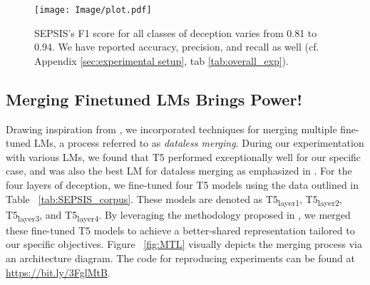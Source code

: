 \vspace{-1.5mm}
\begin{figure}[H]
\centering
\vspace{-2mm}
\texttt{[image: Image/plot.pdf]}
\vspace{-7mm}
\caption{SEPSIS's F1 score for all classes of deception varies from 0.81 to 0.94. We have reported accuracy, precision, and recall as well (cf. Appendix \ref{sec:experimental setup}, tab \ref{tab:overall_exp}).}
\label{fig:MTL_result}
\vspace{-4mm}
\end{figure}
\vspace{-2mm}

\noindent
\vspace{-5mm}
\subsection{Merging Finetuned LMs Brings Power!}
\vspace{-1mm}
Drawing inspiration from \cite{jin2022dataless}, we incorporated techniques for merging multiple fine-tuned LMs, a process referred to as \emph{dataless merging}. During our experimentation with various LMs, we found that T5 performed exceptionally well for our specific case, and was also the best LM for dataless merging as emphasized in \cite{jin2022dataless}. For the four layers of deception, we fine-tuned four T5 models using the data outlined in Table ~\ref{tab:SEPSIS_corpus}. These models are denoted as T5\textsubscript{layer1}, T5\textsubscript{layer2}, T5\textsubscript{layer3}, and T5\textsubscript{layer4}. By leveraging the methodology proposed in \cite{jin2022dataless}, we merged these fine-tuned T5 models to achieve a better-shared representation tailored to our specific objectives.  Figure ~\ref{fig:MTL} visually depicts the merging process via an architecture diagram. The code for reproducing experiments can be found at \url{https://bit.ly/3FglMtB}.
\noindent
\vspace{-3mm}
